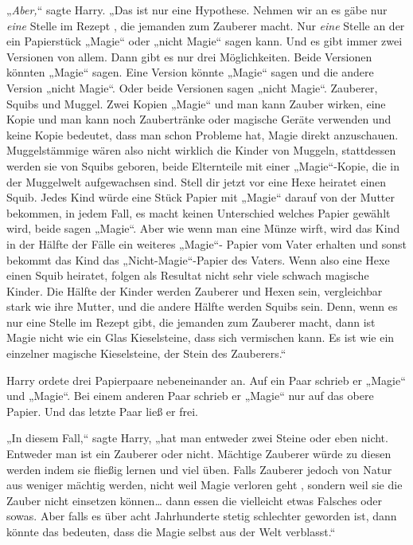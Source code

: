 {„\emph{Aber,}“ sagte Harry. „Das ist nur eine Hypothese. Nehmen wir an es gäbe nur \emph{eine} Stelle im Rezept , die jemanden zum Zauberer macht. Nur \emph{eine} Stelle an der ein Papierstück „Magie“ oder „nicht Magie“ sagen kann. Und es gibt immer zwei Versionen von allem. Dann gibt es nur drei Möglichkeiten. Beide Versionen könnten „Magie“ sagen. Eine Version könnte „Magie“ sagen und die andere Version „nicht Magie“. Oder beide Versionen sagen „nicht Magie“. Zauberer, Squibs und Muggel. Zwei Kopien „Magie“ und man kann Zauber wirken, eine Kopie und man kann noch Zaubertränke oder magische Geräte verwenden und keine Kopie bedeutet, dass man schon Probleme hat, Magie direkt anzuschauen. Muggelstämmige wären also nicht wirklich die Kinder von Muggeln, stattdessen werden sie von Squibs geboren, beide Elternteile mit einer „Magie“-Kopie, die in der Muggelwelt aufgewachsen sind. Stell dir jetzt vor eine Hexe heiratet einen Squib. Jedes Kind würde eine Stück Papier mit „Magie“ darauf von der Mutter bekommen, in jedem Fall, es macht keinen Unterschied welches Papier gewählt wird, beide sagen „Magie“. Aber wie wenn man eine Münze wirft, wird das Kind in der Hälfte der Fälle ein weiteres „Magie“- Papier vom Vater erhalten und sonst bekommt das Kind das „Nicht-Magie“-Papier des Vaters. Wenn also eine Hexe einen Squib heiratet, folgen als Resultat nicht sehr viele schwach magische Kinder. Die Hälfte der Kinder werden Zauberer und Hexen sein, vergleichbar stark wie ihre Mutter, und die andere Hälfte werden Squibs sein. Denn, wenn es nur eine Stelle im Rezept gibt, die jemanden zum Zauberer macht, dann ist Magie nicht wie ein Glas Kieselsteine, dass sich vermischen kann. Es ist wie ein einzelner magische Kieselsteine, der Stein des Zauberers.“

Harry ordete drei Papierpaare nebeneinander an. Auf ein Paar schrieb er „Magie“ und „Magie“. Bei einem anderen Paar schrieb er „Magie“ nur auf das obere Papier. Und das letzte Paar ließ er frei.

„In diesem Fall,“ sagte Harry, „hat man entweder zwei Steine oder eben nicht. Entweder man ist ein Zauberer oder nicht. Mächtige Zauberer würde zu diesen werden indem sie fließig lernen und viel üben. Falls Zauberer jedoch von Natur aus weniger mächtig werden, nicht weil Magie verloren geht , sondern weil sie die Zauber nicht einsetzen können… dann essen die vielleicht etwas Falsches oder sowas. Aber falls es über acht Jahrhunderte stetig schlechter geworden ist, dann könnte das bedeuten, dass die Magie selbst aus der Welt verblasst.“

}
